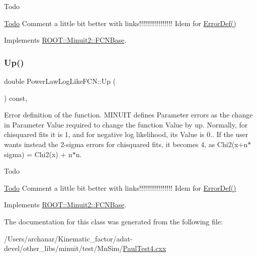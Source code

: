 \begin{DoxyRefDesc}{Todo}
\item[\mbox{\hyperlink{todo__todo000001}{Todo}}]Comment a little bit better with links!!!!!!!!!!!!!!!!! Idem for \mbox{\hyperlink{classROOT_1_1Minuit2_1_1FCNBase_ac4592475c58a65b037ba97ab5f3cba10}{Error\+Def()}}\end{DoxyRefDesc}


Implements \mbox{\hyperlink{classROOT_1_1Minuit2_1_1FCNBase_a04ef08ddad92ce8d89d498efbe021c39}{R\+O\+O\+T\+::\+Minuit2\+::\+F\+C\+N\+Base}}.

\mbox{\label{classPowerLawLogLikeFCN_ae1700e7288ed461d0e3354a2f2c5ea6a}} 
\subsubsection{\texorpdfstring{Up()}{Up()}\hspace{0.1cm}{\footnotesize\ttfamily [2/2]}}
{\footnotesize\ttfamily double Power\+Law\+Log\+Like\+F\+C\+N\+::\+Up (\begin{DoxyParamCaption}{ }\end{DoxyParamCaption}) const\hspace{0.3cm}{\ttfamily [inline]}, {\ttfamily [virtual]}}

Error definition of the function. M\+I\+N\+U\+IT defines Parameter errors as the change in Parameter Value required to change the function Value by up. Normally, for chisquared fits it is 1, and for negative log likelihood, its Value is 0.. If the user wants instead the 2-\/sigma errors for chisquared fits, it becomes 4, as Chi2(x+n$\ast$sigma) = Chi2(x) + n$\ast$n.

\begin{DoxyRefDesc}{Todo}
\item[\mbox{\hyperlink{todo__todo000001}{Todo}}]Comment a little bit better with links!!!!!!!!!!!!!!!!! Idem for \mbox{\hyperlink{classROOT_1_1Minuit2_1_1FCNBase_ac4592475c58a65b037ba97ab5f3cba10}{Error\+Def()}}\end{DoxyRefDesc}


Implements \mbox{\hyperlink{classROOT_1_1Minuit2_1_1FCNBase_a04ef08ddad92ce8d89d498efbe021c39}{R\+O\+O\+T\+::\+Minuit2\+::\+F\+C\+N\+Base}}.



The documentation for this class was generated from the following file\+:\begin{DoxyCompactItemize}
\item 
/\+Users/archanar/\+Kinematic\+\_\+factor/adat-\/devel/other\+\_\+libs/minuit/test/\+Mn\+Sim/\mbox{\hyperlink{adat-devel_2other__libs_2minuit_2test_2MnSim_2PaulTest4_8cxx}{Paul\+Test4.\+cxx}}\end{DoxyCompactItemize}
